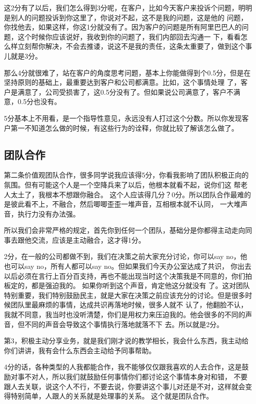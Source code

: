 \documentclass[12pt]{article}
\begin{document}
这2分有了以后，我们怎么得到3分呢，在客户，比如今天客户来投诉个问题，明明是别人的问题投诉到你这里了，你说对不起，这不是我的问题，这是他的 问题，你找他去，如果这样，你这1分就没有了。因为客户的问题是所有阿里巴巴人的问题，这个时候你应该说好，我收到你的问题了，我们内部回去沟通一 下，看看怎么样立刻帮你解决，不会去推诿，说这不是我的责任，这条太重要了，做到这个事儿就是3分。

那么4分就很难了，站在客户的角度思考问题，基本上你能做得到个0.5分，但是在坚持原则的基础上，最重要达到客户和公司都满意。比如，这个事情处理 了，客户是满意了，公司受损害了，这0.5分没有了。但如果说公司满意了，客户不满意，0.5分也没有。

5分基本上不用看，是一个指导性意见，永远没有人打过这个分数。所以你发现客户第一不知道怎么做的时候，有这些行为的诠释，你就比较了解该怎么做了。

\subsection{团队合作}
第二条价值观团队合作，很多同学说我应该得5分，你看我影响了团队积极正向的氛围。但有可能这个人是一个空降兵来了以后，他根本就看不起，说你们这 帮老人太土了，我根本不想跟你融合。 这个人应该得几分？0分。所以团队合作最难的是彼此看不上，不融合，然后唧唧歪歪一堆声音，互相根本就不认同， 一大堆声音，执行力没有办法强。

所以我们会非常严格的规定，首先你到任何一个团队，基础分是你都得主动走向同事去跟他交流，应该是主动融合，这才得1分。

2分，在一般的公司都做不到，我们在决策之前大家充分讨论，你可以say no，他也可以say no，所有人都可以say no。但如果我们今天办公室达成了共识， 你出去以后必须在言行上百分百支持，再也不能出现当时这个决策我是不同意的，你们拍板定的，都是强迫我的。 如果你听到这个声音，肯定他这分就没有 了。这对团队特别重要，我们特别鼓励民主，就是大家在决策之前应该充分的讨论。但是很多时候团队里最麻烦的事情，达成共识再落地时候，很多人就不 认了，他翻脸不认，我就不同意，我当时也没听清楚，你们是用权力来压迫我的。他会很多的不同的声音，但不同的声音会导致这个事情执行落地就落不下 去。所以就是2分。

第3，积极主动分享业务，就是我们刚才说的教学相长，我会什么东西，我主动给你们讲讲，我有会什么东西会主动给予同事帮助。

4分的话，各种类型的人我都能合作，我不能够仅仅跟我喜欢的人去合作，这是鼓励对事不对人，所以我们就鼓励任何事情你们都讨论这个事情本身对和错， 不要跟人去关联，说这个人不行，不要去说，你要讲这个事儿对还是不对，这样就会变得特别简单，人跟人的关系就是处理事的关系。 这个就是团队合作。
\end{document}

